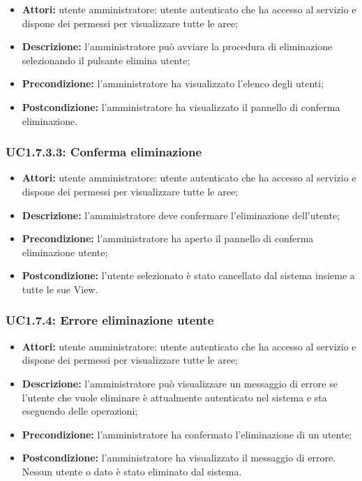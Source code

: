 \begin{itemize}
    \item \textbf{Attori:} utente amministratore: utente autenticato che ha accesso al servizio e dispone dei permessi per visualizzare tutte le aree;
    \item \textbf{Descrizione:} l'amministratore può avviare la procedura di eliminazione selezionando il pulsante elimina utente;
    \item \textbf{Precondizione:} l'amministratore ha visualizzato l'elenco degli utenti;
    \item \textbf{Postcondizione:} l'amministratore ha visualizzato il pannello di conferma eliminazione.
\end{itemize}

\subsubsection{UC1.7.3.3: Conferma eliminazione}

\begin{itemize}
    \item \textbf{Attori:} utente amministratore: utente autenticato che ha accesso al servizio e dispone dei permessi per visualizzare tutte le aree;
    \item \textbf{Descrizione:} l'amministratore deve confermare l'eliminazione dell'utente;
    \item \textbf{Precondizione:} l'amministratore ha aperto il pannello di conferma eliminazione utente;
    \item \textbf{Postcondizione:} l'utente selezionato è stato cancellato dal sistema insieme a tutte le sue View.
\end{itemize}

\subsubsection{UC1.7.4: Errore eliminazione utente}


\begin{itemize}
    \item \textbf{Attori:} utente amministratore: utente autenticato che ha accesso al servizio e dispone dei permessi per visualizzare tutte le aree;
    \item \textbf{Descrizione:} l'amministratore può visualizzare un messaggio di errore se l'utente che vuole eliminare è attualmente autenticato nel sistema e sta eseguendo delle operazioni;
    \item \textbf{Precondizione:} l'amministratore ha confermato l'eliminazione di un utente;
    \item \textbf{Postcondizione:} l'amministratore ha visualizzato il messaggio di errore. Nessun utente o dato è stato eliminato dal sistema.
\end{itemize}

